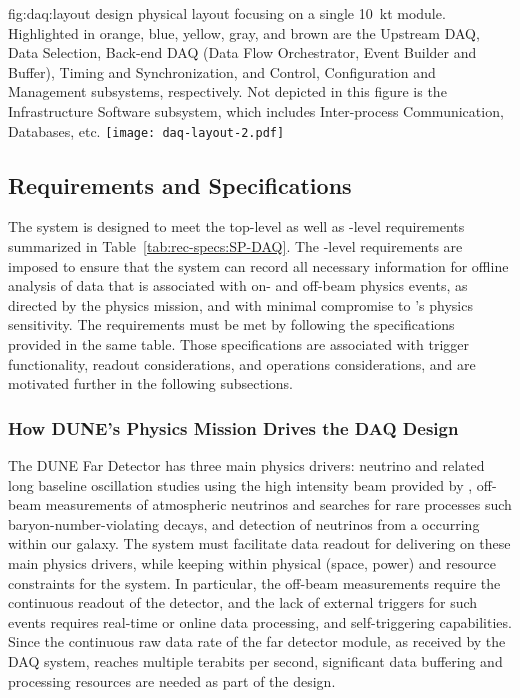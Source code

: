 \begin{dunefigure}{fig:daq:layout}{ design physical layout
    focusing on a single \SI{10}{\kilo\tonne} module. 
    Highlighted in orange, blue, yellow, gray, and brown are the Upstream DAQ,
    Data Selection, Back-end DAQ (Data Flow Orchestrator, Event Builder and
    Buffer), Timing and Synchronization, and Control, Configuration and
    Management subsystems, respectively. 
    Not depicted in this figure is the Infrastructure Software subsystem, which
    includes Inter-process Communication, Databases, etc.
  }
  \texttt{[image: daq-layout-2.pdf]}
\end{dunefigure}


\subsection{Requirements and Specifications}
\label{sec:daq:requirements}

The    system is designed to meet the
 top-level as well as -level requirements
summarized in Table~\ref{tab:rec-specs:SP-DAQ}. The -level requirements are
imposed to ensure that the 
system %
can record all necessary information for offline 
analysis of data that is associated with on- and off-beam physics events, as directed
by the  physics mission, and with minimal compromise to
's physics sensitivity. The requirements must be met by following the 
specifications provided in the same table. Those specifications are
associated with trigger functionality, readout considerations,
and operations considerations, and are motivated further in the following subsections.

\subsubsection{How DUNE's Physics Mission Drives the DAQ Design}

The DUNE Far Detector has three main physics drivers: neutrino  and related
long baseline oscillation studies using the high intensity beam provided
by \fnal, off-beam measurements of atmospheric neutrinos and searches
for rare processes such baryon-number-violating decays,
and detection of neutrinos from a  occurring within our galaxy. The
   system must facilitate data
readout for delivering on these main physics drivers, while keeping
within physical (space, power) and resource constraints for
the system. In particular, the off-beam measurements require the
continuous readout of the detector, and the lack of external triggers for such
events requires real-time or online data processing, and
self-triggering capabilities. Since the
continuous raw data rate of the far detector module, as received by
the DAQ system, reaches multiple
terabits per second, significant data buffering and processing
resources are needed as part of the design.


